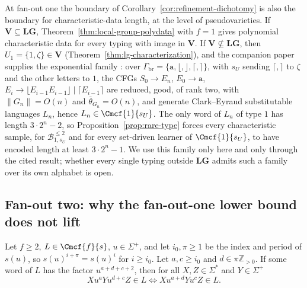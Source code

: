 \begin{remark}
\label{rem:fanout-one-data}
At fan-out one the boundary of
Corollary~\ref{cor:refinement-dichotomy} is also the boundary for
characteristic-data length, at the level of pseudovarieties.  If
$\mathbf V\subseteq\mathbf{LG}$, Theorem~\ref{thm:local-group-polydata}
with $f=1$ gives polynomial characteristic data for every typing with
image in $\mathbf V$.  If $\mathbf V\not\subseteq\mathbf{LG}$, then
$U_1=\{1,\zeta\}\in\mathbf V$ (Theorem~\ref{thm:lg-characterization}), and
the companion paper supplies the exponential family
\cite[Prop.~6.4]{kuriyamaCFG}: over
$\Gamma_{\mathrm{br}}=\{\mathtt a,\lfloor,\rfloor,\lceil,\rceil\}$, with
$s_U$ sending $\lceil,\rceil$ to $\zeta$ and the other letters to $1$,
the CFGs $S_0\to E_n$, $E_0\to\mathtt a$,
$E_i\to\lfloor E_{i-1}E_{i-1}\rfloor\mid\lceil E_{i-1}\rceil$ are reduced,
good, of rank two, with $\|G_n\|=O(n)$ and $\bar\theta_{G_n}=O(n)$, and
generate Clark--Eyraud substitutable languages $L_n$, hence
$L_n\in\Cmcf{1}{s_U}$.  The only word of $L_n$ of type $1$ has length
$3\cdot2^n-2$, so Proposition~\ref{prop:rare-type} forces every
characteristic sample, for $\mathcal B^{\le2}_{1,s_U}$ and for every
set-driven learner of $\Cmcf{1}{s_U}$, to have encoded length at least
$3\cdot2^n-1$.  We use this family only here and only through the cited
result; whether every single typing outside $\mathbf{LG}$ admits such a
family over its own alphabet is open.
\end{remark}


\subsection*{Fan-out two: why the fan-out-one lower bound does not lift}

\begin{lemma}
\label{lem:power-transfer}
Let $f\ge2$, $L\in\Cmcf{f}{s}$, $u\in\Sigma^+$, and let $i_0,\pi\ge1$ be
the index and period of $s(u)$, so $s(u)^{i+\pi}=s(u)^i$ for $i\ge i_0$.
Let $a,c\ge i_0$ and $d\in\pi\mathbb Z_{>0}$.  If some word of $L$ has the
factor $u^{a+d+c+2}$, then for all $X,Z\in\Sigma^*$ and $Y\in\Sigma^+$
\[
 Xu^{a}Yu^{d+c}Z\in L\iff Xu^{a+d}Yu^{c}Z\in L .
\]
\end{lemma}

